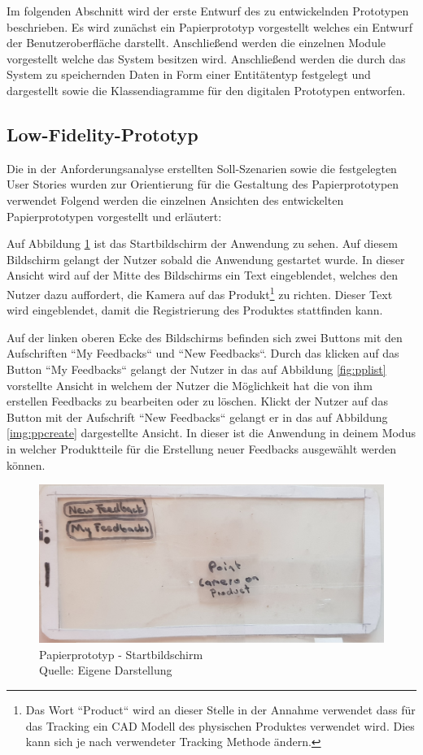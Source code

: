 Im folgenden Abschnitt wird der erste Entwurf des zu entwickelnden Prototypen beschrieben. Es wird zunächst ein Papierprototyp vorgestellt welches ein Entwurf der Benutzeroberfläche darstellt. 
Anschließend werden die einzelnen Module vorgestellt welche das System besitzen wird. Anschließend werden die durch das System zu speichernden Daten in Form einer Entitätentyp festgelegt und dargestellt
sowie die Klassendiagramme für den digitalen Prototypen entworfen.  

\subsection{Low-Fidelity-Prototyp}

Die in der Anforderungsanalyse erstellten Soll-Szenarien sowie die festgelegten User Stories wurden zur Orientierung für die Gestaltung des Papierprototypen verwendet
Folgend werden die einzelnen Ansichten des entwickelten Papierprototypen vorgestellt und erläutert: 

Auf Abbildung \ref{img:pp_start} ist das Startbildschirm der Anwendung zu sehen. Auf diesem Bildschirm gelangt der Nutzer sobald die Anwendung gestartet wurde. 
In dieser Ansicht wird auf der Mitte des Bildschirms ein Text eingeblendet, welches den Nutzer dazu auffordert, die Kamera auf das Produkt\footnote{Das Wort ``Product`` wird an dieser Stelle in der Annahme verwendet dass für das Tracking ein CAD Modell des physischen Produktes verwendet wird. Dies kann sich je nach verwendeter Tracking Methode ändern. } zu richten. Dieser Text 
wird eingeblendet, damit die Registrierung des Produktes stattfinden kann. 

Auf der linken oberen Ecke des Bildschirms befinden sich zwei Buttons mit den Aufschriften ``My Feedbacks`` und ``New Feedbacks``. Durch das klicken auf das Button ``My Feedbacks`` gelangt der Nutzer in 
das auf Abbildung \ref{fig:pplist} vorstellte Ansicht in welchem der Nutzer die Möglichkeit hat die von ihm erstellen Feedbacks zu bearbeiten oder zu löschen. Klickt der Nutzer auf das Button mit der Aufschrift 
``New Feedbacks`` gelangt er in das auf Abbildung \ref{img:ppcreate} dargestellte Ansicht. In dieser ist die Anwendung in deinem Modus in welcher Produktteile für die Erstellung neuer Feedbacks ausgewählt werden können. 

\begin{figure}[H]
	\centering
	\includegraphics[width=.7\textwidth]{resources/conception/lowfi_startbildschirm.jpg}
	\caption{Papierprototyp - Startbildschirm  \\Quelle: Eigene Darstellung}
	\label{img:pp_start}
\end{figure}

